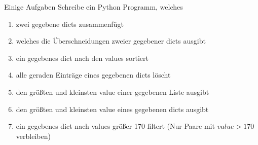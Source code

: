 \begin{frame}{Einige Aufgaben}
Schreibe ein Python Programm, welches
	\begin{enumerate}
		\item zwei gegebene dicts zusammenfügt
		\item welches die Überschneidungen zweier gegebener dicts ausgibt
		\item ein gegebenes dict nach den values sortiert
		\item alle geraden Einträge eines gegebenen dicts löscht
		\item den größten und kleinsten value einer gegebenen Liste ausgibt
		\item den größten und kleinsten value eines gegebenen dicts ausgibt
		\item ein gegebenes dict nach values größer 170 filtert (Nur Paare mit $value>170$ verbleiben)
	\end{enumerate}
\end{frame}


